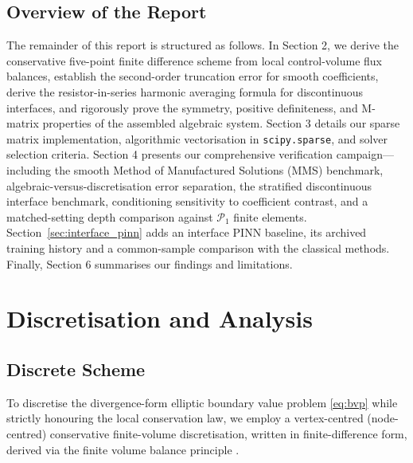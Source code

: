 \documentclass[11pt,a4paper]{article}
\theoremstyle{definition}
\theoremstyle{remark}
\begin{document}
\subsection{Overview of the Report}
The remainder of this report is structured as follows. In Section 2, we derive the conservative five-point finite difference scheme from local control-volume flux balances, establish the second-order truncation error for smooth coefficients, derive the resistor-in-series harmonic averaging formula for discontinuous interfaces, and rigorously prove the symmetry, positive definiteness, and M-matrix properties of the assembled algebraic system. Section 3 details our sparse matrix implementation, algorithmic vectorisation in \texttt{scipy.sparse}, and solver selection criteria. Section 4 presents our comprehensive verification campaign---including the smooth Method of Manufactured Solutions (MMS) benchmark, algebraic-versus-discretisation error separation, the stratified discontinuous interface benchmark, conditioning sensitivity to coefficient contrast, and a matched-setting depth comparison against $\mathcal{P}_1$ finite elements. Section~\ref{sec:interface_pinn} adds an interface PINN baseline, its archived training history and a common-sample comparison with the classical methods. Finally, Section 6 summarises our findings and limitations.




\newpage
\section{Discretisation and Analysis}

\subsection{Discrete Scheme}
To discretise the divergence-form elliptic boundary value problem \eqref{eq:bvp} while strictly honouring the local conservation law, we employ a vertex-centred (node-centred) conservative finite-volume discretisation, written in finite-difference form, derived via the finite volume balance principle \cite{hackbusch2017, hiptmair2025}.
\end{document}
